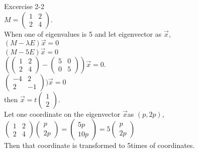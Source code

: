 \documentclass[11pt, oneside]{article}   	%
\begin{document}
Excercise 2-2\\
 
$ M=
\begin{pmatrix}
 1 & 2\\
 2 & 4
\end{pmatrix}.$\\

When one of eigenvalues is 5 and let eigenvector as $\vec x$, \\
$(M-\lambda E) \vec x = 0$\\
$(M-5 E) \vec x = 0$\\
$ (\begin{pmatrix}
 1 & 2\\
 2 & 4
\end{pmatrix}-
\begin{pmatrix}
 5 & 0\\
 0 & 5
\end{pmatrix})\vec x = 0.$\\
$\begin{pmatrix}
 -4 & 2\\
 2 & -1
\end{pmatrix})\vec x = 0$\\
then $\vec x = t\begin{pmatrix}
 1\\
 2
\end{pmatrix}$.\\

Let one coordinate on the eigenvector $\vec x$as $ (p,2p)$,\\
$\begin{pmatrix}
 1 & 2\\
 2 & 4
\end{pmatrix}
\begin{pmatrix}
 p\\
 2p
\end{pmatrix}= \begin{pmatrix}
 5p\\
 10p
\end{pmatrix}= 5\begin{pmatrix}
 p\\
 2p
\end{pmatrix}$\\


Then that coordinate is transformed to 5times of coordinates.\\ 
\end{document}
